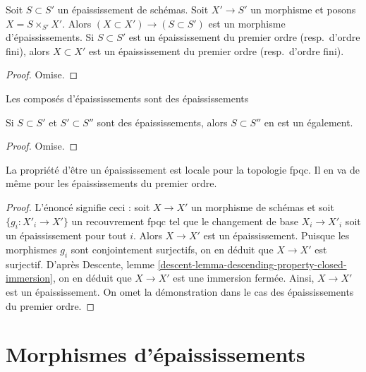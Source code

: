 \begin{lemma}
\label{lemma-base-change-thickening}
Soit $S \subset S'$ un épaississement de schémas. Soit $X' \to S'$ un morphisme
et posons $X = S \times_{S'} X'$. Alors $(X \subset X') \to (S \subset S')$
est un morphisme d'épaississements. Si $S \subset S'$ est un épaississement du premier
ordre (resp.\ d'ordre fini), alors $X \subset X'$ est un épaississement du premier
ordre (resp.\ d'ordre fini).
\end{lemma}

\begin{proof}
Omise.
\end{proof}

\begin{lemma}
\label{lemma-composition-thickening}
\begin{slogan}
Les composés d'épaississements sont des épaississements
\end{slogan}
Si $S \subset S'$ et $S' \subset S''$ sont des épaississements, alors
$S \subset S''$ en est un également.
\end{lemma}

\begin{proof}
Omise.
\end{proof}

\begin{lemma}
\label{lemma-descending-property-thickening}
La propriété d'être un épaississement est locale pour la topologie fpqc.
Il en va de même pour les épaississements du premier ordre.
\end{lemma}

\begin{proof}
L'énoncé signifie ceci : soit $X \to X'$ un morphisme
de schémas et soit $\{g_i : X'_i \to X'\}$
un recouvrement fpqc tel que le changement de base $X_i \to X'_i$
soit un épaississement pour tout $i$. Alors $X \to X'$ est un épaississement.
Puisque les morphismes $g_i$ sont conjointement surjectifs, on en déduit
que $X \to X'$ est surjectif. D'après
Descente, lemme \ref{descent-lemma-descending-property-closed-immersion},
on en déduit que $X \to X'$ est une immersion fermée.
Ainsi, $X \to X'$ est un épaississement. On omet la démonstration dans le
cas des épaississements du premier ordre.
\end{proof}









\section{Morphismes d'épaississements}
\label{section-morphisms-thickenings}


